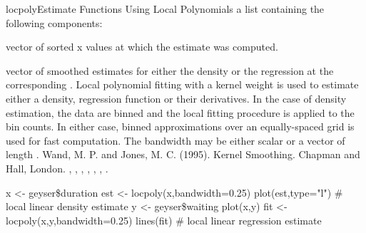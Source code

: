 \begin{Helpfile}{locpoly}{Estimate Functions Using Local Polynomials}
a list containing the following components:
\item[\Co{x:}]
vector of sorted x values at which the estimate was computed.
\item[\Co{y:}]
vector of smoothed estimates for either the density or the regression
at the corresponding .
Local polynomial fitting with a kernel weight is used to
estimate either a density, regression function or their
derivatives. In the case of density estimation, the 
data are binned and the local fitting procedure is applied to 
the bin counts. In either case, binned approximations over
an equally-spaced grid is used for fast computation. The
bandwidth may be either scalar or a vector of length
.
Wand, M. P. and Jones, M. C. (1995).
Kernel Smoothing.
Chapman and Hall, London.
, , , , , , .
\need 15pt
\vspace{-16pt}
\begin{Example}
x <- geyser\$duration
est <- locpoly(x,bandwidth=0.25)
plot(est,type="l")
# local linear density estimate
y <- geyser\$waiting
plot(x,y)
fit <- locpoly(x,y,bandwidth=0.25)
lines(fit)
# local linear regression estimate
\end{Example}
\end{Helpfile}
%



